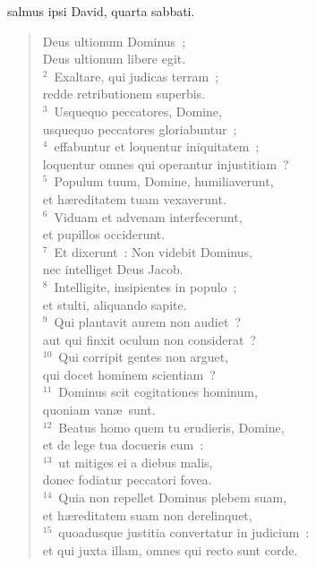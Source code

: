 \bchapter
{}salmus ipsi David, quarta sabbati. \begin{flushleft}\begin{verse}\vspace{6pt}Deus ultionum Dominus~;\\ Deus ultionum libere egit.\\
${}^{2}$~Exaltare, qui judicas terram~;\\ redde retributionem superbis.\\
${}^{3}$~Usquequo peccatores, Domine,\\ usquequo peccatores gloriabuntur~;\\
${}^{4}$~effabuntur et loquentur iniquitatem~;\\ loquentur omnes qui operantur injustitiam~?\\
${}^{5}$~Populum tuum, Domine, humiliaverunt,\\ et h\ae reditatem tuam vexaverunt.\\
${}^{6}$~Viduam et advenam interfecerunt,\\ et pupillos occiderunt.\\
${}^{7}$~Et dixerunt~: Non videbit Dominus,\\ nec intelliget Deus Jacob.\\
${}^{8}$~Intelligite, insipientes in populo~;\\ et stulti, aliquando sapite.\\
${}^{9}$~Qui plantavit aurem non audiet~?\\ aut qui finxit oculum non considerat~?\\
${}^{10}$~Qui corripit gentes non arguet,\\ qui docet hominem scientiam~?\\
${}^{11}$~Dominus scit cogitationes hominum,\\ quoniam van\ae\ sunt.\\
${}^{12}$~Beatus homo quem tu erudieris, Domine,\\ et de lege tua docueris eum~:\\
${}^{13}$~ut mitiges ei a diebus malis,\\ donec fodiatur peccatori fovea.\\
${}^{14}$~Quia non repellet Dominus plebem suam,\\ et h\ae reditatem suam non derelinquet,\\
${}^{15}$~quoadusque justitia convertatur in judicium~:\\ et qui juxta illam, omnes qui recto sunt corde.\\

\end{verse}
\end{flushleft}
